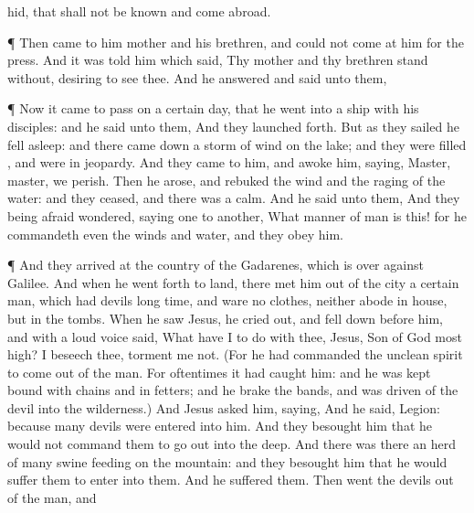 {{{{}
hid,
that
shall
not
be known
and
come
abroad.}}
\par }{\PP {}¶
Then
came
to
him
{}
mother
and
his
brethren,
and
could
not
come at
him
for the
press.
And it was
told
him
{} which
said,
Thy
mother
and
thy
brethren
stand
without,
desiring to
see
thee.
And he
answered and
said
unto
them,
{}
\par }{\PP {}¶
Now it came to
pass
on a
certain
day,
that
he
went
into a
ship
with
his
disciples:
and he
said
unto
them,
{}
And they launched
forth.
But as
they
sailed he fell
asleep:
and there came
down a
storm of
wind
on the
lake;
and they were
filled
{},
and were in
jeopardy.
And they came to
him, and
awoke
him,
saying,
Master,
master, we
perish.
Then he
arose, and
rebuked the
wind
and the
raging of the
water:
and they
ceased,
and there
was a
calm.
And he
said unto
them,
{}
And they being
afraid
wondered,
saying
one
to
another,
What manner of
man
is
this!
for he
commandeth
even the
winds
and
water,
and they
obey
him.
\par }{\PP {}¶
And they
arrived
at the
country of the
Gadarenes,
which
is over
against
Galilee.
And
when
he
went
forth to
land, there
met
him out
of the
city a
certain
man,
which
had
devils
long
time,
and
ware
no
clothes,
neither
abode
in
{}
house,
but
in the
tombs.
When he
saw
Jesus, he cried
out, and fell
down before
him,
and with a
loud
voice
said,
What have
I to
do with
thee,
Jesus,
{}
Son of
God most
high? I
beseech
thee,
torment
me
not.
(For he had
commanded the
unclean
spirit to come
out
of the
man.
For
oftentimes it had
caught
him:
and he was
kept
bound with
chains
and in
fetters;
and he
brake the
bands, and was
driven
of the
devil
into the
wilderness.)
And
Jesus
asked
him,
saying,
{}
And he
said,
Legion:
because
many
devils were
entered
into
him.
And they
besought
him
that he
would
not
command
them to go
out
into the
deep.
And there
was
there an
herd of
many
swine
feeding
on the
mountain:
and they
besought
him
that he would
suffer
them to
enter
into
them.
And he
suffered
them.
Then
went the
devils out
of the
man, and
}
